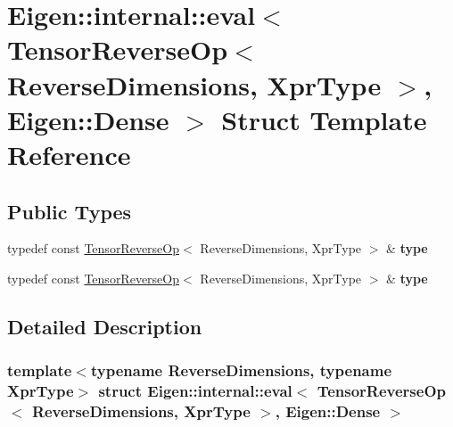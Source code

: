 \hypertarget{struct_eigen_1_1internal_1_1eval_3_01_tensor_reverse_op_3_01_reverse_dimensions_00_01_xpr_type_01_4_00_01_eigen_1_1_dense_01_4}{}\section{Eigen\+:\+:internal\+:\+:eval$<$ Tensor\+Reverse\+Op$<$ Reverse\+Dimensions, Xpr\+Type $>$, Eigen\+:\+:Dense $>$ Struct Template Reference}
\label{struct_eigen_1_1internal_1_1eval_3_01_tensor_reverse_op_3_01_reverse_dimensions_00_01_xpr_type_01_4_00_01_eigen_1_1_dense_01_4}
\subsection*{Public Types}
\begin{DoxyCompactItemize}
\item 
\mbox{\label{struct_eigen_1_1internal_1_1eval_3_01_tensor_reverse_op_3_01_reverse_dimensions_00_01_xpr_type_01_4_00_01_eigen_1_1_dense_01_4_a7b56f12c752cc25bf6c29e2fc0d2d49e}} 
typedef const \hyperlink{class_eigen_1_1_tensor_reverse_op}{Tensor\+Reverse\+Op}$<$ Reverse\+Dimensions, Xpr\+Type $>$ \& {\bfseries type}
\item 
\mbox{\label{struct_eigen_1_1internal_1_1eval_3_01_tensor_reverse_op_3_01_reverse_dimensions_00_01_xpr_type_01_4_00_01_eigen_1_1_dense_01_4_a7b56f12c752cc25bf6c29e2fc0d2d49e}} 
typedef const \hyperlink{class_eigen_1_1_tensor_reverse_op}{Tensor\+Reverse\+Op}$<$ Reverse\+Dimensions, Xpr\+Type $>$ \& {\bfseries type}
\end{DoxyCompactItemize}


\subsection{Detailed Description}
\subsubsection*{template$<$typename Reverse\+Dimensions, typename Xpr\+Type$>$\newline
struct Eigen\+::internal\+::eval$<$ Tensor\+Reverse\+Op$<$ Reverse\+Dimensions, Xpr\+Type $>$, Eigen\+::\+Dense $>$}




